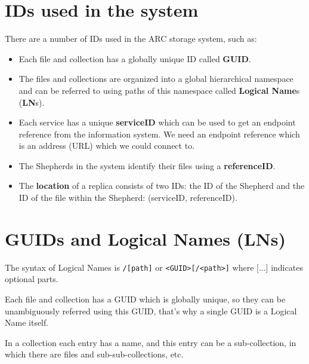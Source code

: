 \documentclass{book}
\begin{document}
\section{IDs used in the system}
\label{sec:IDs}

There are a number of IDs used in the ARC storage system, such as:
\begin{itemize}
    \item Each file and collection has a globally unique ID called \textbf{GUID}.
    \item The files and collections are organized into a global hierarchical namespace and can be referred to using paths of this namespace called \textbf{Logical Name}s (\textbf{LN}s).
    \item Each service has a unique \textbf{serviceID} which can be used to get an endpoint reference from the information system. We need an endpoint reference which is an address (URL) which we could connect to.
    \item The Shepherds in the system identify their files using a \textbf{referenceID}.
    \item The \textbf{location} of a replica consists of two IDs: the ID of the Shepherd and the ID of the file within the Shepherd: (serviceID, referenceID).
\end{itemize}


\section{GUIDs and Logical Names (LNs)} %
\label{sec:GUIDsLNs}

The syntax of Logical Names is \verb#/[path]# or \verb#<GUID>[/<path>]# where [...] indicates optional parts.

Each file and collection has a GUID which is globally unique, so they can be unambiguously referred using this GUID, that's why a single GUID is a Logical Name itself.

In a collection each entry has a name, and this entry can be a sub-collection, in which there are files and sub-sub-collections, etc.

\begin{figure}[ht]
\end{figure}
\end{document}
